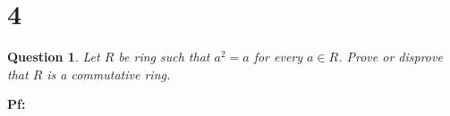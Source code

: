 \documentclass{article}
\newtheorem{question}{Question}
\begin{document}
\break

\section*{4}
\begin{question}
    Let $R$ be ring such that $a^2=a$ for every $a\in R$. Prove or disprove that $R$ is a
commutative ring.
\end{question}

\textbf{Pf:}
\end{document}

